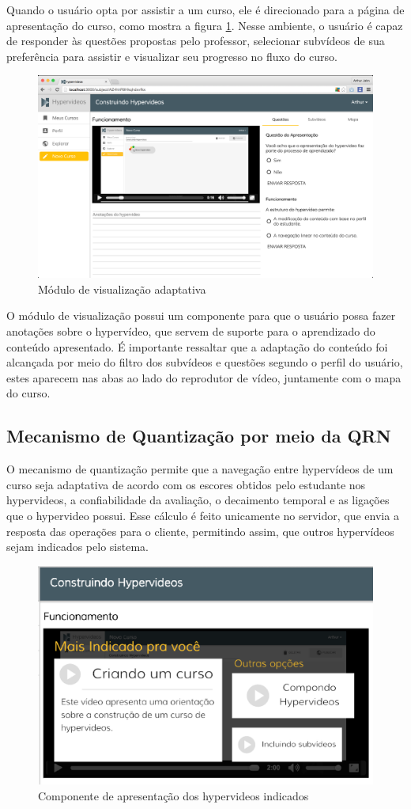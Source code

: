 Quando o usuário opta por assistir a um curso, ele é direcionado para a página de apresentação do curso, como mostra a figura \ref{fig:apresentar}. Nesse ambiente, o usuário é capaz de responder às questões propostas pelo professor, selecionar subvídeos de sua preferência para assistir e visualizar seu progresso no fluxo do curso.  

\begin{figure}[h!]
  	\centering
  	\includegraphics[width=.9\linewidth]{figuras/apresentar.eps}
  	\caption{Módulo de visualização adaptativa}
  	\label{fig:apresentar}
\end{figure}

O módulo de visualização possui um componente para que o usuário possa fazer anotações sobre o hypervídeo, que servem de suporte para o aprendizado do conteúdo apresentado. É importante ressaltar que a adaptação do conteúdo foi alcançada por meio do filtro dos subvídeos e questões segundo o perfil do usuário, estes aparecem nas abas ao lado do reprodutor de vídeo, juntamente com o mapa do curso.

\subsection{Mecanismo de Quantização por meio da QRN}

O mecanismo de quantização permite que a navegação entre hypervídeos de um curso seja adaptativa de acordo com os escores obtidos pelo estudante nos hypervideos, a confiabilidade da avaliação, o decaimento temporal e as ligações que o hypervideo possui. Esse cálculo é feito unicamente no servidor, que envia a resposta das operações para o cliente, permitindo assim, que outros hypervídeos sejam indicados pelo sistema. 

\begin{figure}[h!]
  	\centering
  	\includegraphics[width=.5\linewidth]{figuras/quantizacao.eps}
  	\caption{Componente de apresentação dos hypervideos indicados}
  	\label{fig:quantizacao}
\end{figure}

